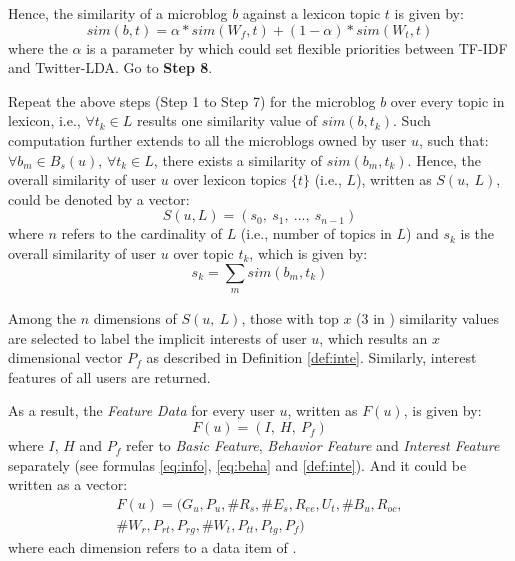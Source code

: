 \begin{comment}
:
\begin{equation}
\label{eq:sim-tw2}
sim(w'_i, t) = \sum_{\substack{j}} sim(w'_i, c_j)
\end{equation}
\end{comment}



 Hence, the similarity of a microblog $b$ against a lexicon topic $t$ is given by:
\begin{equation}
\label{eq:simbt}
sim(b, t) = \alpha * sim(W_f, t) + (1 - \alpha) * sim(W_t, t)
\end{equation}
where the $\alpha$ is a parameter by which \sys{} could set flexible priorities between TF-IDF and Twitter-LDA.
Go to \textbf{Step 8}.

 Repeat the above steps (Step 1 to Step 7) for the microblog $b$ over every topic in lexicon, i.e., $\forall t_k \in L$ results one similarity value of $sim(b, t_k)$.
Such computation further extends to all the microblogs owned by user $u$, such that:
$\forall b_m \in B_s(u)$, $\forall t_k \in L$, there exists a similarity of $sim(b_m, t_k)$.
Hence, the overall similarity of user $u$ over lexicon topics $\{t\}$ (i.e., $L$), written as $S(u,\ L)$, could be denoted by a vector:
\begin{equation}
\label{eq:simul}
S(u, L) = (s_0,\ s_1,\ ...,\ s_{n-1})
\end{equation}
where $n$ refers to the cardinality of $L$ (i.e., number of topics in $L$) and $s_k$ is the overall similarity of user $u$ over topic $t_k$, which is given by:
\begin{equation}
\label{eq:simul-2}
s_k = \sum_{\substack{m}} sim(b_m, t_k)
\end{equation}

Among the $n$ dimensions of $S(u,\ L)$, those with top $x$ (3 in \sys{}) similarity values are selected to label the implicit interests of user $u$, which results an $x$ dimensional vector $P_f$ as described in Definition \ref{def:inte}.
Similarly, interest features of all users are returned.

As a result, the \textit{Feature Data} for every user $u$, written as $F(u)$, is given by:
\begin{equation}
\label{eq:fu}
	F(u) = (I,\ H,\ P_f)
\end{equation}
where $I$, $H$ and $P_f$ refer to \textit{Basic Feature}, \textit{Behavior Feature} and \textit{Interest Feature} separately (see formulas \ref{eq:info}, \ref{eq:beha} and \ref{def:inte}).
And it could be written as a vector:
\begin{equation}
\label{eq:fu-flat}
\begin{aligned}
	F(u) = (G_u, P_u, \#R_s, \#E_s, R_{ee}, U_t, \#B_u, R_{oc},\\
    \#W_r, P_{rt}, P_{rg}, \#W_t, P_{tt}, P_{tg}, P_f)
\end{aligned}
\end{equation}
where each dimension refers to a data item of \sys{}.

